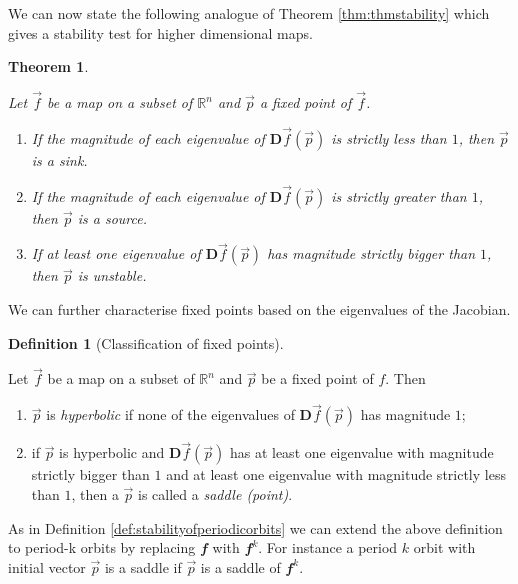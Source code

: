 \documentclass[
  a4paper,
  oneside,
  final]{krantz}
\providecommand{\tightlist}{%
  \setlength{\itemsep}{0pt}\setlength{\parskip}{0pt}}
\newcommand{\R}{\mathbb{R}}
\renewcommand{\v}[1]{{\mathbfit{#1}}}
\newcommand{\jacob}{{\mathbf{D}}\vec{f}}
\newtheorem{theorem}{Theorem}[chapter]
\theoremstyle{definition}
\newtheorem{definition}{Definition}[chapter]
\theoremstyle{definition}
\theoremstyle{definition}
\theoremstyle{definition}
\theoremstyle{remark}
\begin{document}
We can now state the following analogue of Theorem \ref{thm:thmstability} which gives a stability test for higher dimensional maps.

\begin{theorem}
\protect\hypertarget{thm:stabilityhigherdim}{}\label{thm:stabilityhigherdim}

Let \(\vec{f}\) be a map on a subset of \(\R^n\) and \(\vec{p}\) a fixed point of \(\vec{f}\).

\begin{enumerate}
\def\labelenumi{\arabic{enumi}.}
\tightlist
\item
  If the magnitude of each eigenvalue of \(\jacob(\vec{p})\) is strictly less than \(1\), then \(\vec{p}\) is a sink.
\item
  If the magnitude of each eigenvalue of \(\jacob(\vec{p})\) is strictly greater than \(1\), then \(\vec{p}\) is a source.
\item
  If at least one eigenvalue of \(\jacob(\vec{p})\) has magnitude strictly bigger than \(1\), then \(\vec{p}\) is unstable.
\end{enumerate}

\end{theorem}

We can further characterise fixed points based on the eigenvalues of the Jacobian.

\begin{definition}[Classification of fixed points]
\protect\hypertarget{def:classificationoffixedpoints}{}\label{def:classificationoffixedpoints}

Let \(\vec{f}\) be a map on a subset of \(\R^{n}\) and \(\vec{p}\) be a fixed point of \(f\). Then

\begin{enumerate}
\def\labelenumi{\arabic{enumi}.}
\tightlist
\item
  \(\vec{p}\) is \emph{hyperbolic} if none of the eigenvalues of \(\jacob(\vec{p})\) has magnitude \(1\);
\item
  if \(\vec{p}\) is hyperbolic and \(\jacob(\vec{p})\) has at least one eigenvalue with magnitude strictly bigger than \(1\) and at least one eigenvalue with magnitude strictly less than \(1\), then a \(\vec{p}\) is called a \emph{saddle (point)}.
\end{enumerate}

\end{definition}

As in Definition \ref{def:stabilityofperiodicorbits} we can extend the above definition to period-k orbits by replacing \(\v{f}\) with \(\v{f}^{k}\). For instance a period \(k\) orbit with initial vector \(\vec{p}\) is a saddle if \(\vec{p}\) is a saddle of \(\v{f}^{k}\).
\end{document}
